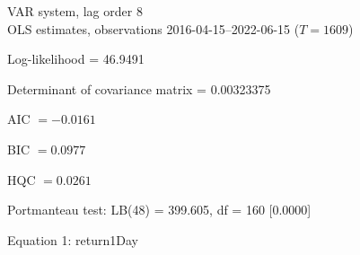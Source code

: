\begin{center}
VAR system, lag order 8\\
OLS estimates, observations 2016-04-15--2022-06-15 ($T=1609$)
\end{center}
\noindent
Log-likelihood = 46.9491\par
\noindent
Determinant of covariance matrix = 0.00323375\par
\noindent
AIC $= -0.0161$ \par
\noindent
BIC $= 0.0977$ \par
\noindent
HQC $= 0.0261$ \par
\noindent
Portmanteau test: LB(48) = 399.605, df = 160 [0.0000]\par
\begin{center}

Equation 1: return1Day\\

\vspace{1em}


\end{center}
